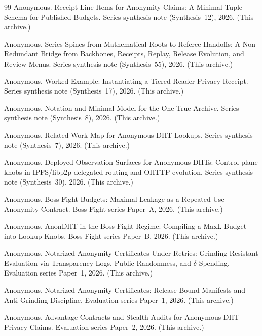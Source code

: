 \documentclass[11pt]{article}
\begin{document}
\begin{thebibliography}{99}
Anonymous.
\newblock Receipt Line Items for Anonymity Claims: A Minimal Tuple Schema for Published Budgets.
\newblock Series synthesis note (Synthesis~12), 2026. (This archive.)

Anonymous.
\newblock Series Spines from Mathematical Roots to Referee Handoffs: A Non-Redundant Bridge from Backbones, Receipts, Replay, Release Evolution, and Review Menus.
\newblock Series synthesis note (Synthesis~55), 2026. (This archive.)

Anonymous.
\newblock Worked Example: Instantiating a Tiered Reader-Privacy Receipt.
\newblock Series synthesis note (Synthesis~17), 2026. (This archive.)

Anonymous.
\newblock Notation and Minimal Model for the One-True-Archive.
\newblock Series synthesis note (Synthesis~8), 2026. (This archive.)

Anonymous.
\newblock Related Work Map for Anonymous {DHT} Lookups.
\newblock Series synthesis note (Synthesis~7), 2026. (This archive.)

Anonymous.
\newblock Deployed Observation Surfaces for Anonymous DHTs: Control-plane knobs in IPFS/libp2p delegated routing and OHTTP evolution.
\newblock Series synthesis note (Synthesis~30), 2026. (This archive.)


Anonymous.
\newblock Boss Fight Budgets: Maximal Leakage as a Repeated-Use Anonymity Contract.
\newblock Boss Fight series Paper~A, 2026. (This archive.)

Anonymous.
\newblock AnonDHT in the Boss Fight Regime: Compiling a MaxL Budget into Lookup Knobs.
\newblock Boss Fight series Paper~B, 2026. (This archive.)

Anonymous.
\newblock Notarized Anonymity Certificates Under Retries: Grinding-Resistant Evaluation via Transparency Logs, Public Randomness, and $\delta$-Spending.
\newblock Evaluation series Paper~1, 2026. (This archive.)

Anonymous.
\newblock Notarized Anonymity Certificates: Release-Bound Manifests and Anti-Grinding Discipline.
\newblock Evaluation series Paper~1, 2026. (This archive.)

Anonymous.
\newblock Advantage Contracts and Stealth Audits for Anonymous-DHT Privacy Claims.
\newblock Evaluation series Paper~2, 2026. (This archive.)



\end{thebibliography}
\end{document}
